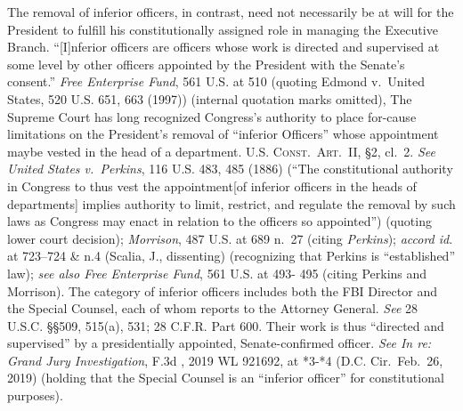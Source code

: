 The removal of inferior officers, in contrast, need not necessarily be at will for the President to fulfill his constitutionally assigned role in managing the Executive Branch.
“[I]nferior officers are officers whose work is directed and supervised at some level by other officers appointed by the President with the Senate’s consent.”
\textit{Free Enterprise Fund}, 561 U.S. at 510 (quoting Edmond v.\ United States, 520 U.S. 651, 663 (1997)) (internal quotation marks omitted), The Supreme Court has long recognized Congress’s authority to place for-cause limitations on the President’s removal of “inferior Officers” whose appointment maybe vested in the head of a department.
\textsc{U.S. Const.\ Art.~II}, \S 2, cl.~2.
\textit{See United States v.\ Perkins}, 116 U.S. 483, 485 (1886) (“The constitutional authority in Congress to thus vest the appointment[of inferior officers in the heads of departments] implies authority to limit, restrict, and regulate the removal by such laws as Congress may enact in relation to the officers so appointed”) (quoting lower court decision);
\textit{Morrison}, 487 U.S. at 689 n.~27 (citing \textit{Perkins});
\textit{accord id}. at 723--724 \& n.4 (Scalia, J., dissenting) (recognizing that Perkins is “established” law);
\textit{see also Free Enterprise Fund}, 561 U.S. at 493- 495 (citing Perkins and Morrison).
The category of inferior officers includes both the FBI Director and the Special Counsel, each of whom reports to the Attorney General.
\textit{See} 28 U.S.C. \S\S 509, 515(a), 531; 28 C.F.R. Part 600.
Their work is thus “directed and supervised” by a presidentially appointed, Senate-confirmed officer.
\textit{See In re: Grand Jury Investigation}, \textunderscore\textunderscore F.3d \textunderscore\textunderscore, 2019 WL 921692, at *3-*4 (D.C. Cir.\ Feb.~26, 2019) (holding that the Special Counsel is an “inferior officer” for constitutional purposes).

